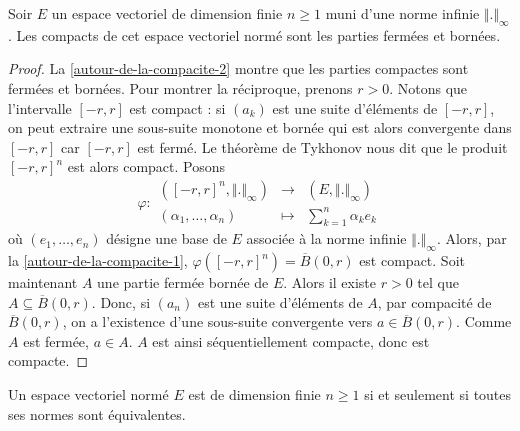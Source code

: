   \begin{proposition}
    \label{autour-de-la-compacite-3}
    Soir $E$ un espace vectoriel de dimension finie $n \geq 1$ muni d'une norme infinie $\Vert . \Vert_\infty$. Les compacts de cet espace vectoriel normé sont les parties fermées et bornées.
  \end{proposition}

  \begin{proof}
    La \cref{autour-de-la-compacite-2} montre que les parties compactes sont fermées et bornées. Pour montrer la réciproque, prenons $r > 0$. Notons que l'intervalle $[-r,r]$ est compact : si $(a_k)$ est une suite d'éléments de $[-r,r]$, on peut extraire une sous-suite monotone et bornée qui est alors convergente dans $[-r,r]$ car $[-r,r]$ est fermé. Le théorème de Tykhonov nous dit que le produit $[-r,r]^n$ est alors compact.
    \newpar
    Posons
    \[
      \varphi :
      \begin{array}{ccc}
        ([-r, r]^n, \Vert . \Vert_\infty) &\rightarrow& (E, \Vert . \Vert_\infty) \\
        (\alpha_1, \dots, \alpha_n) &\mapsto& \sum_{k=1}^n \alpha_k e_k
      \end{array}
    \]
    où $(e_1, \dots, e_n)$ désigne une base de $E$ associée à la norme infinie $\Vert . \Vert_\infty$. Alors, par la \cref{autour-de-la-compacite-1}, $\varphi([-r, r]^n) = \overline{B}(0,r)$ est compact.
    \newpar
    Soit maintenant $A$ une partie fermée bornée de $E$. Alors il existe $r > 0$ tel que $A \subseteq \overline{B}(0,r)$. Donc, si $(a_n)$ est une suite d'éléments de $A$, par compacité de $\overline{B}(0,r)$, on a l'existence d'une sous-suite convergente vers $a \in \overline{B}(0,r)$. Comme $A$ est fermée, $a \in A$. $A$ est ainsi séquentiellement compacte, donc est compacte.
  \end{proof}

  \begin{theorem}
    \label{autour-de-la-compacite-4}
    Un espace vectoriel normé $E$ est de dimension finie $n \geq 1$ si et seulement si toutes ses normes sont équivalentes.
  \end{theorem}

